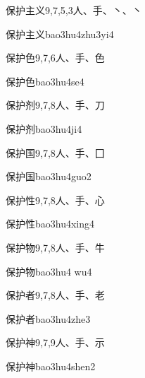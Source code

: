 \begin{Entry}{保护主义}{9,7,5,3}{⼈、⼿、⼂、⼂}
  \begin{Phonetics}{保护主义}{bao3hu4zhu3yi4}
  \end{Phonetics}
\end{Entry}

\begin{Entry}{保护色}{9,7,6}{⼈、⼿、⾊}
  \begin{Phonetics}{保护色}{bao3hu4se4}
  \end{Phonetics}
\end{Entry}

\begin{Entry}{保护剂}{9,7,8}{⼈、⼿、⼑}
  \begin{Phonetics}{保护剂}{bao3hu4ji4}
  \end{Phonetics}
\end{Entry}

\begin{Entry}{保护国}{9,7,8}{⼈、⼿、⼞}
  \begin{Phonetics}{保护国}{bao3hu4guo2}
  \end{Phonetics}
\end{Entry}

\begin{Entry}{保护性}{9,7,8}{⼈、⼿、⼼}
  \begin{Phonetics}{保护性}{bao3hu4xing4}
  \end{Phonetics}
\end{Entry}

\begin{Entry}{保护物}{9,7,8}{⼈、⼿、⽜}
  \begin{Phonetics}{保护物}{bao3hu4 wu4}
  \end{Phonetics}
\end{Entry}

\begin{Entry}{保护者}{9,7,8}{⼈、⼿、⽼}
  \begin{Phonetics}{保护者}{bao3hu4zhe3}
  \end{Phonetics}
\end{Entry}

\begin{Entry}{保护神}{9,7,9}{⼈、⼿、⽰}
  \begin{Phonetics}{保护神}{bao3hu4shen2}
  \end{Phonetics}
\end{Entry}

